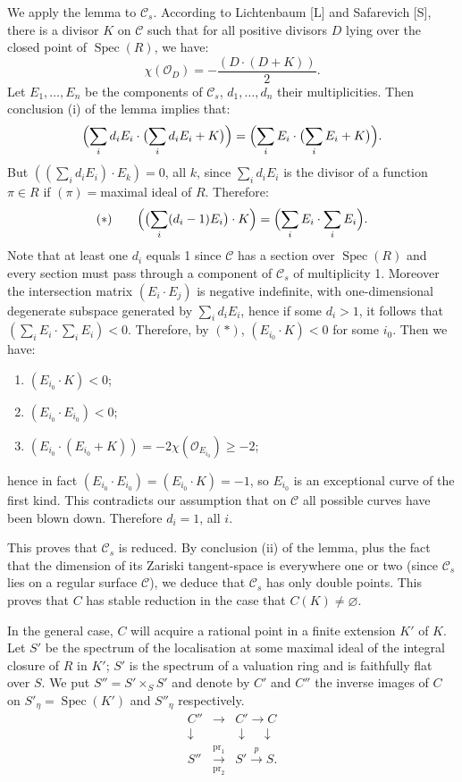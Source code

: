 \documentclass[10pt]{article}
\newcommand{\Spec}{\operatorname{Spec}}
\newcommand{\cO}{\mathcal O}
\begin{document}
We apply the lemma to $\mathscr C_s$. According to Lichtenbaum [L] and Safarevich [S], there is a divisor $K$ on $\mathscr C$ such that for all positive divisors $D$ lying over the closed point of $\Spec(R)$, we have:
\[
\chi(\cO_D)=-\frac{(D\cdot(D+K))}{2}.
\]
Let $E_1,\ldots,E_n$ be the components of $\mathscr C_s$, $d_1,\ldots,d_n$ their multiplicities. Then conclusion (i) of the lemma implies that:
\[
\Bigl(\sum_i d_iE_i\cdot\bigl(\sum_i d_iE_i+K\bigr)\Bigr)=
\Bigl(\sum_i E_i\cdot\bigl(\sum_i E_i+K\bigr)\Bigr).
\]
But $((\sum_i d_iE_i)\cdot E_k)=0$, all $k$, since $\sum_i d_iE_i$ is the divisor of a function $\pi\in R$ if $(\pi)={}$maximal ideal of $R$. Therefore:
\[
(*)\qquad \Bigl(\bigl(\sum_i(d_i-1)E_i\bigr)\cdot K\Bigr)=\Bigl(\sum_i E_i\cdot\sum_i E_i\Bigr).
\]
Note that at least one $d_i$ equals 1 since $\mathscr C$ has a section over $\Spec(R)$ and every section must pass through a component of $\mathscr C_s$ of multiplicity 1. Moreover the intersection matrix $(E_i\cdot E_j)$ is negative indefinite, with one-dimensional degenerate subspace generated by $\sum_i d_iE_i$, hence if some $d_i>1$, it follows that $(\sum_i E_i\cdot\sum_i E_i)<0$. Therefore, by $(*)$, $(E_{i_0}\cdot K)<0$ for some $i_0$. Then we have:
\begin{enumerate}[label=\emph{\alph*)}]
\item $(E_{i_0}\cdot K)<0$;
\item $(E_{i_0}\cdot E_{i_0})<0$;
\item $(E_{i_0}\cdot(E_{i_0}+K))=-2\chi(\cO_{E_{i_0}})\geq -2$;
\end{enumerate}
hence in fact $(E_{i_0}\cdot E_{i_0})=(E_{i_0}\cdot K)=-1$, so $E_{i_0}$ is an exceptional curve of the first kind. This contradicts our assumption that on $\mathscr C$ all possible curves have been blown down. Therefore $d_i=1$, all $i$.

This proves that $\mathscr C_s$ is reduced. By conclusion (ii) of the lemma, plus the fact that the dimension of its Zariski tangent-space is everywhere one or two (since $\mathscr C_s$ lies on a regular surface $\mathscr C$), we deduce that $\mathscr C_s$ has only double points. This proves that $C$ has stable reduction in the case that $C(K)\ne\varnothing$.

In the general case, $C$ will acquire a rational point in a finite extension $K'$ of $K$. Let $S'$ be the spectrum of the localisation at some maximal ideal of the integral closure of $R$ in $K'$; $S'$ is the spectrum of a valuation ring and is faithfully flat over $S$. We put $S''=S'\times_S S'$ and denote by $C'$ and $C''$ the inverse images of $C$ on $S'_\eta=\Spec(K')$ and $S''_\eta$ respectively.
\[
\begin{array}{ccc}
C''&\longrightarrow&C'\longrightarrow C\\[2pt]
\downarrow&&\downarrow\quad\downarrow\\[-1pt]
S''&\xrightarrow[\mathrm{pr}_2]{\mathrm{pr}_1}&S'\xrightarrow{\ p\ }S.
\end{array}
\]
\end{document}
